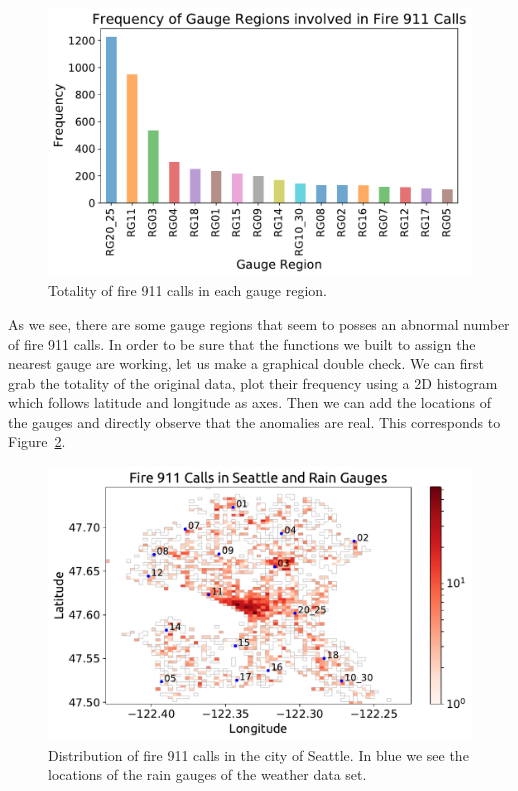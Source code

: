 \documentclass[12pt,a4paper]{article}
\begin{document}
\begin{figure}[ht!]
\centering
\includegraphics[scale=0.6]{figs/CallsvGauge.pdf}
\caption{Totality of fire 911 calls in each gauge region.}
\label{CallsvGauge}
\end{figure}

As we see, there are some gauge regions that seem to posses an abnormal number of fire 911 calls. In order to be sure that the functions we built to assign the nearest gauge are working, let us make a graphical double check. We can first grab the totality of the original data, plot their frequency using a 2D histogram which follows latitude and longitude as axes. Then we can add the locations of the gauges and directly observe that the anomalies are real. This corresponds to Figure~\ref{2DHist}.

\begin{figure}[ht!]
\centering
\includegraphics[scale=0.7]{figs/2DHist.pdf}
\caption{Distribution of fire 911 calls in the city of Seattle. In blue we see the locations of the rain gauges of the weather data set.}
\label{2DHist}
\end{figure}
\end{document}
